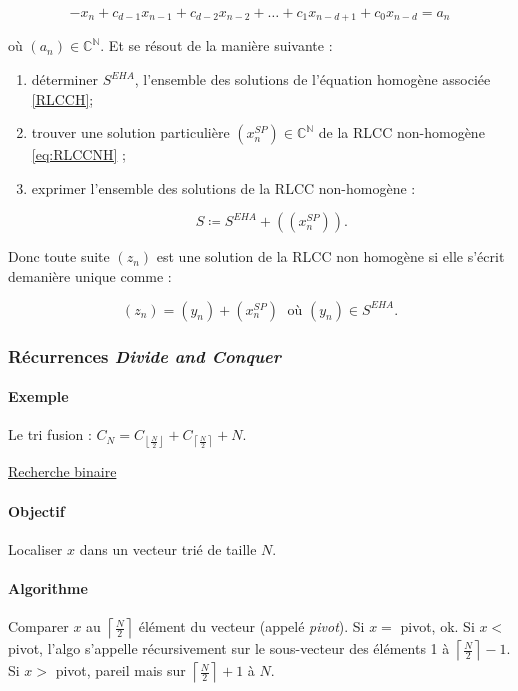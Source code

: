 \documentclass{article}
\newcommand{\floor}[1]{{\left\lfloor#1\right\rfloor}}
\newcommand{\ceil}[1]{{\left\lceil#1\right\rceil}}
\begin{document}
			\begin{equation}\label{eq:RLCCNH}
				-x_n + c_{d-1}x_{n-1} + c_{d-2}x_{n-2} + \ldots + c_1x_{n-d+1} + c_0x_{n-d} = a_n
			\end{equation}

			où $(a_n) \in \mathbb C^{\mathbb N}$. Et se résout de la manière suivante :
			\begin{enumerate}
				\item déterminer $S^{EHA}$, l'ensemble des solutions de l'équation homogène associée \eqref{RLCCH};
				\item trouver une solution particulière $(x^{SP}_n) \in \mathbb C^{\mathbb N}$ de la RLCC non-homogène \eqref{eq:RLCCNH} ;
				\item exprimer l'ensemble des solutions de la RLCC non-homogène :

					  \[S \coloneqq S^{EHA} + ((x^{SP}_n)).\]
			\end{enumerate}

			Donc toute suite $(z_n)$ est une solution de la RLCC non homogène si elle s'écrit demanière unique comme :

			\[(z_n) = (y_n) + (x^{SP}_n) \;\text{ où } (y_n) \in S^{EHA}.\]

			\subsubsection{Récurrences \textit{Divide and Conquer}}

			\paragraph{Exemple} Le tri fusion : $C_N = C_\floor{\frac N2} + C_\ceil{\frac N2} + N$.

			\underline{Recherche binaire}

			\paragraph{Objectif} Localiser $x$ dans un vecteur trié de taille $N$.

			\paragraph{Algorithme} Comparer $x$ au $\ceil{\frac N2}$ élément du vecteur (appelé \textit{pivot}). Si $x = $ pivot, ok. Si $x < $ pivot, l'algo s'appelle
			récursivement sur le sous-vecteur des éléments 1 à $\ceil {\frac N2}-1$. Si $x > $ pivot, pareil mais sur $\ceil{\frac N2}+1$ à $N$.
\end{document}

